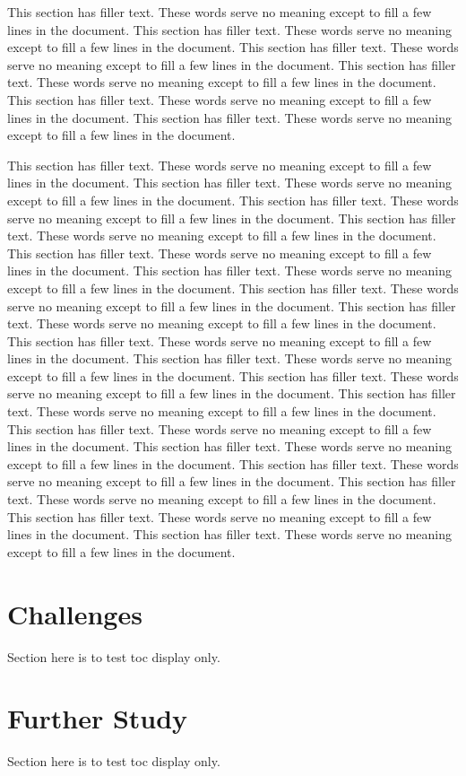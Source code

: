 This section has filler text. These words serve no meaning except to fill a few lines in the document. This section has filler text. These words serve no meaning except to fill a few lines in the document. This section has filler text. These words serve no meaning except to fill a few lines in the document. This section has filler text. These words serve no meaning except to fill a few lines in the document. This section has filler text. These words serve no meaning except to fill a few lines in the document. This section has filler text. These words serve no meaning except to fill a few lines in the document.

This section has filler text. These words serve no meaning except to fill a few lines in the document. This section has filler text. These words serve no meaning except to fill a few lines in the document. This section has filler text. These words serve no meaning except to fill a few lines in the document. This section has filler text. These words serve no meaning except to fill a few lines in the document. This section has filler text. These words serve no meaning except to fill a few lines in the document. This section has filler text. These words serve no meaning except to fill a few lines in the document. This section has filler text. These words serve no meaning except to fill a few lines in the document. This section has filler text. These words serve no meaning except to fill a few lines in the document. This section has filler text. These words serve no meaning except to fill a few lines in the document. This section has filler text. These words serve no meaning except to fill a few lines in the document. This section has filler text. These words serve no meaning except to fill a few lines in the document. This section has filler text. These words serve no meaning except to fill a few lines in the document. This section has filler text. These words serve no meaning except to fill a few lines in the document. This section has filler text. These words serve no meaning except to fill a few lines in the document. This section has filler text. These words serve no meaning except to fill a few lines in the document. This section has filler text. These words serve no meaning except to fill a few lines in the document. This section has filler text. These words serve no meaning except to fill a few lines in the document. This section has filler text. These words serve no meaning except to fill a few lines in the document.

\section{Challenges}
Section here is to test toc display only.

\section{Further Study}
Section here is to test toc display only.

